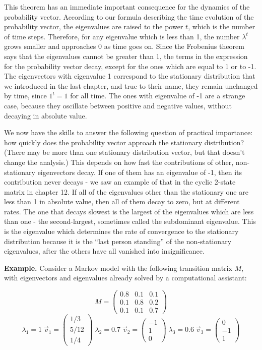 \documentclass[
  letterpaper,
  DIV=11,
  numbers=noendperiod]{scrreprt}
\begin{document}
This theorem has an immediate important consequence for the dynamics of
the probability vector. According to our formula describing the time
evolution of the probability vector, the eigenvalues are raised to the
power \(t\), which is the number of time steps. Therefore, for any
eigenvalue which is less than 1, the number \(\lambda^t\) grows smaller
and approaches 0 as time goes on. Since the Frobenius theorem says that
the eigenvalues cannot be greater than 1, the terms in the expression
for the probability vector decay, except for the ones which are equal to
1 or to -1. The eigenvectors with eigenvalue 1 correspond to the
stationary distribution that we introduced in the last chapter, and true
to their name, they remain unchanged by time, since \(1^t =1\) for all
time. The ones with eigenvalue of -1 are a strange case, because they
oscillate between positive and negative values, without decaying in
absolute value.

We now have the skills to answer the following question of practical
importance: how quickly does the probability vector approach the
stationary distribution? (There may be more than one stationary
distribution vector, but that doesn't change the analysis.) This depends
on how fast the contributions of other, non-stationary eigenvectors
decay. If one of them has an eigenvalue of -1, then its contribution
never decays - we saw an example of that in the cyclic 2-state matrix in
chapter 12. If all of the eigenvalues other than the stationary one are
less than 1 in absolute value, then all of them decay to zero, but at
different rates. The one that decays slowest is the largest of the
eigenvalues which are less than one - the second-largest, sometimes
called the subdominant eigenvalue. This is the eigenvalue which
determines the rate of convergence to the stationary distribution
because it is the ``last person standing'' of the non-stationary
eigenvalues, after the others have all vanished into insignificance.

\textbf{Example.} Consider a Markov model with the following transition
matrix \(M\), with eigenvectors and eigenvalues already solved by a
computational assistant:

\[ M = \left(\begin{array}{ccc} 0.8 & 0.1  & 0.1  \\ 0.1 & 0.8 & 0.2 \\ 0.1 & 0.1 & 0.7 \end{array}\right)\]
\[ \lambda_1 = 1 \; \vec v_1= \left(\begin{array}{c} 1/3     \\  5/12  \\ 1/4 \end{array}\right) \; \lambda_2 = 0.7  \;  \vec v_2= \left(\begin{array}{c} -1   \\ 1  \\ 0 \end{array}\right) \; \lambda_3 = 0.6  \;  \vec v_3= \left(\begin{array}{c} 0  \\ -1  \\ 1 \end{array}\right)\]
\end{document}
